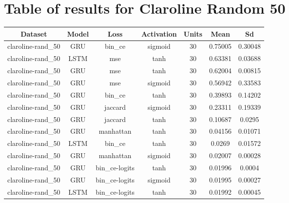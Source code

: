\documentclass{article}%
\begin{document}
%
\newpage%
\section{Table of results for Claroline Random 50}%
\label{sec:TableofresultsforClarolineRandom50}%
\begin{longtable}{|c|c|c|c|c|c|c|}%
\hline%
\rowcolor{lightgray!70}%
\textbf{Dataset}&\textbf{Model}&\textbf{Loss}&\textbf{Activation}&\textbf{Units}&\textbf{Mean}&\textbf{Sd}\\%
\hline%
claroline{-}rand\_50&GRU&bin\_ce&sigmoid&30&0.75005&0.30048\\%
\hline%
claroline{-}rand\_50&LSTM&mse&tanh&30&0.63381&0.03688\\%
\hline%
claroline{-}rand\_50&GRU&mse&tanh&30&0.62004&0.00815\\%
\hline%
claroline{-}rand\_50&GRU&mse&sigmoid&30&0.56942&0.33583\\%
\hline%
claroline{-}rand\_50&GRU&bin\_ce&tanh&30&0.39893&0.14202\\%
\hline%
claroline{-}rand\_50&GRU&jaccard&sigmoid&30&0.23311&0.19339\\%
\hline%
claroline{-}rand\_50&GRU&jaccard&tanh&30&0.10687&0.0295\\%
\hline%
claroline{-}rand\_50&GRU&manhattan&tanh&30&0.04156&0.01071\\%
\hline%
claroline{-}rand\_50&LSTM&bin\_ce&tanh&30&0.0269&0.01572\\%
\hline%
claroline{-}rand\_50&GRU&manhattan&sigmoid&30&0.02007&0.00028\\%
\hline%
claroline{-}rand\_50&GRU&bin\_ce{-}logits&tanh&30&0.01996&0.0004\\%
\hline%
claroline{-}rand\_50&GRU&bin\_ce{-}logits&sigmoid&30&0.01995&0.00027\\%
\hline%
claroline{-}rand\_50&LSTM&bin\_ce{-}logits&tanh&30&0.01992&0.00045\\%
\hline%
\end{longtable}

%
\newpage%
\end{document}
